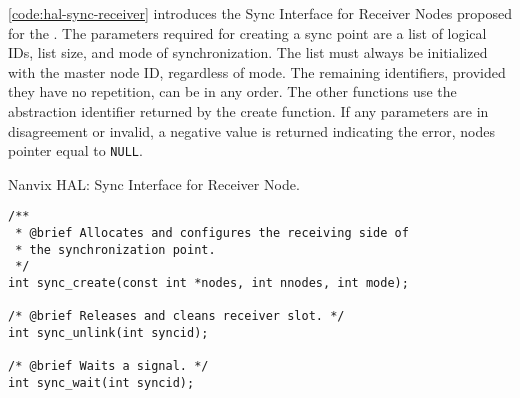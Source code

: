 				\autoref{code:hal-sync-receiver} introduces the Sync Interface for
				Receiver Nodes proposed for the \nanvix \hal. The parameters required
				for creating a sync point are a list of logical IDs, list size,
				and mode of synchronization. The list must always be initialized
				with the master node ID, regardless of mode. The remaining identifiers,
				provided they have no repetition, can be in any order. The other
				functions use the abstraction identifier returned by the create
				function. If any parameters are in disagreement or invalid, a
				negative value is returned indicating the error, \eg nodes pointer
				equal to \texttt{NULL}.

\begin{listing}[!tb]
\caption{Nanvix HAL: Sync Interface for Receiver Node.}
\label{code:hal-sync-receiver}
\begin{verbatim}
/**
 * @brief Allocates and configures the receiving side of
 * the synchronization point.
 */
int sync_create(const int *nodes, int nnodes, int mode);

/* @brief Releases and cleans receiver slot. */
int sync_unlink(int syncid);

/* @brief Waits a signal. */
int sync_wait(int syncid);
\end{verbatim}
\end{listing}



